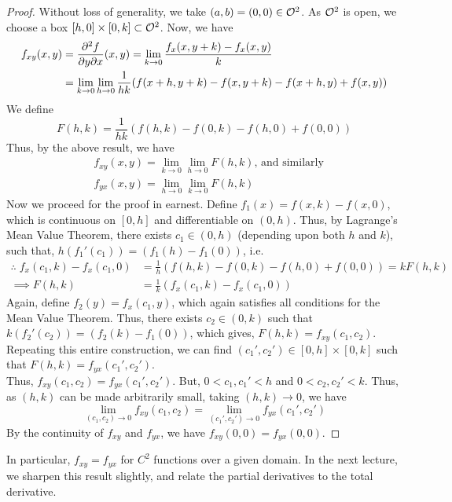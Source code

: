 \documentclass[../Analysis-3.tex]{subfiles}
\begin{document}
\begin{proof}
  Without loss of generality, we take $(a,b) = (0,0) \in \mathcal{O}_{}^2$. As $\mathcal{O}_{}^2$ is open, we choose a box $[h,0]\times [0,k] \subset \mathcal{O}_{}^2$. Now, we have
  \begin{align*}
    f_{xy}(x,y)
     & = \pdv{f}{y}{x}\/(x,y) = \lim_{k \to 0} \frac{f_x(x,y+k) - f_x(x,y)}{k}                \\
     & = \lim_{k \to 0} \lim_{h \to 0} \frac{1}{hk}(f(x+h,y+k) - f(x,y+k) - f(x+h,y)+ f(x,y))
  \end{align*}
  We define
  \[F(h,k) = \frac{1}{hk}(f(h,k) - f(0,k) - f(h,0)+ f(0,0))\]
  Thus, by the above result, we have
  \begin{align*}
     & f_{xy}(x,y) = \lim_{k \to 0} \lim_{h \to 0} F(h,k) \text{, and similarly} \\ &f_{yx}(x,y) = \lim_{h \to 0} \lim_{k \to 0} F(h,k)
  \end{align*}
  Now we proceed for the proof in earnest. Define $f_1(x) = f(x,k) - f(x,0)$, which is continuous on $[0,h]$ and differentiable on $(0,h)$. Thus, by Lagrange's Mean Value Theorem, there exists $c_1 \in (0,h)$ (depending upon both $h$ and $k$), such that, $h(f_1'(c_1)) = (f_1(h) - f_1(0))$, i.e.
  \begin{align*}
    \therefore\; f_x(c_1,k) - f_x(c_1,0) & =  \frac{1}{h}(f(h,k) - f(0,k) - f(h,0)+ f(0,0)) = kF(h,k) \\
    \implies F(h,k)                      & = \frac{1}{k}(f_x(c_1,k) - f_x(c_1,0))
  \end{align*}
  Again, define $f_2(y) = f_x(c_1,y)$, which again satisfies all conditions for the Mean Value Theorem. Thus, there exists $c_2 \in (0,k)$ such that $k(f_2'(c_2)) = (f_2(k) - f_1(0))$, which gives, $F(h,k) = f_{xy}(c_1, c_2)$.\\
  Repeating this entire construction, we can find $(c_1', c_2') \in [0,h]\times[0,k]$ such that $F(h,k) = f_{yx}(c_1', c_2')$.\\
  Thus, $f_{xy}(c_1, c_2) = f_{yx}(c_1', c_2')$. But, $0 < c_1, c_1' < h$ and $0 < c_2, c_2' < k$. Thus, as $(h,k)$ can be made arbitrarily small, taking  $(h,k) \to 0$, we have
  \[
    \lim_{(c_1, c_2) \to 0} f_{xy}(c_1, c_2) = \lim_{(c_1', c_2') \to 0} f_{yx}(c_1', c_2')
  \]
  By the continuity of $f_{xy}$ and $f_{yx}$, we have $\boxed{f_{xy}(0,0) = f_{yx}(0,0)}$.

\end{proof}

\msk

In particular, $f_{xy} = f_{yx}$ for $C^2$ functions over a given domain. In the next lecture, we sharpen this result slightly, and relate the  partial derivatives to the total derivative.
\end{document}
